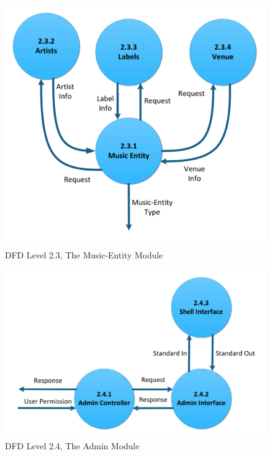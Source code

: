 \documentclass[letterpaper,12pt]{article}
\begin{document}
{\eject

\begin{figure}[h]
\centering
\includegraphics[scale=0.7]{DFD_level_2_3.pdf}
\caption{DFD Level 2.3, The Music-Entity Module}
\label{fig:DFD_level_2.3, The Music-Entity Module}
\end{figure}

\eject

\begin{figure}[h]
\centering
\includegraphics[scale=0.7]{DFD_level_2_4.pdf}
\caption{DFD Level 2.4, The Admin Module}
\label{fig:DFD_level_2.4, The Admin Module}
\end{figure}

}
\end{document}

